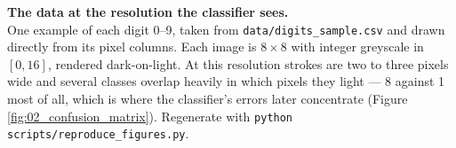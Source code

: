\caption{\textbf{The data at the resolution the classifier sees.}\\
\smallskip
One example of each digit 0--9, taken from \texttt{data/digits\_sample.csv} and
drawn directly from its pixel columns. Each image is $8\times8$ with integer
greyscale in $[0, 16]$, rendered dark-on-light. At this resolution strokes are
two to three pixels wide and several classes overlap heavily in which pixels
they light --- 8 against 1 most of all, which is where the classifier's errors
later concentrate (Figure \ref{fig:02_confusion_matrix}). Regenerate with
\texttt{python scripts/reproduce\_figures.py}.
}
\label{fig:01_digit_grid}
